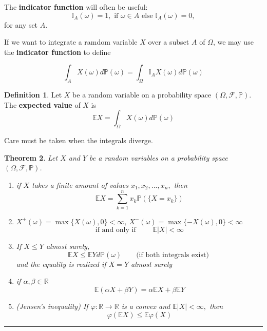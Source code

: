 \documentclass[reqno,a4paper,12pt]{amsart}%
\numberwithin{equation}{section}
\newtheorem{theorem}{Theorem}
\theoremstyle{definition}
\newtheorem{definition}[theorem]{Definition}
\newcommand{\Ee}{{\mathbb{E}}}
\newcommand{\Ii}{{\mathbb{I}}}
\newcommand{\Pp}{{\mathbb{P}}}
\newcommand{\Rr}{{\mathbb{R}}}
\begin{document}
The \textbf{indicator function} will often be useful: $$ \Ii_A (\omega)= 1, \textrm{ if }  \omega \in A \textrm{ else } \Ii_A (\omega)=0,$$ for any set $A$.

If we want to integrate a ramdom variable $X$ over a subset $A$ of $\Omega$, we may use the \textbf{indicator function} to define 

$$ \int_A X(\omega) d \Pp (\omega) = \int_\Omega \Ii_A X(\omega) d \Pp (\omega) $$

\begin{definition}
	Let $X$ be a random variable on a probability space $(\Omega, \mathcal{F}, \Pp)$. The \textbf{expected value} of $X$ is 
	$$\Ee X = \int_\Omega X(\omega) d \Pp (\omega)$$
\end{definition}

Care must be taken when the integrals diverge.

\begin{theorem}
	Let $X$ and $Y$ be a random variables on a probability space $(\Omega, \mathcal{F}, \Pp)$.
	\begin{enumerate}
		\item 	 if $X$ takes a finite amount of values $x_1, x_2,..., x_n,$ then $$\Ee X= \sum_{k=1}^n x_k \Pp (\{ X= x_k \}) $$
		\item $X^+(\omega)=\max \{X(\omega),0\} < \infty, \ X^-(\omega)=\max \{-X(\omega),0\} < \infty $  $$  \textrm{if and only if } \quad \quad \Ee| X| < \infty  $$
		\item  If $X \leq Y$ almost surely, 
		$$  \Ee X \leq \Ee Y d \Pp (\omega) \quad \quad  \textrm{(if both integrals exist) }  $$ and the equality is realized if $X=Y$ almost surely	
		\item if $\alpha, \beta \in \Rr$   $$   \Ee(\alpha X+ \beta Y) = 	 \alpha \Ee X + \beta \Ee Y    $$
		\item (Jensen's inequality) If $\varphi: \Rr \to \Rr$ is a convex and $\Ee |X| < \infty,$ then $$\varphi(\Ee X)\leq \Ee \varphi(X) $$
	\end{enumerate}
\end{theorem}
 



 
\begin{center}
	\par\noindent\rule{200pt}{0.1pt}
\end{center}	

\
\end{document}
